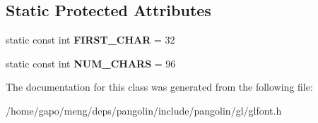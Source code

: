 \subsection*{Static Protected Attributes}
\begin{DoxyCompactItemize}
\item 
static const int {\bfseries F\+I\+R\+S\+T\+\_\+\+C\+H\+AR} = 32\hypertarget{classpangolin_1_1_gl_font_ab37c43cd34933cdf0b8dc675a69183e5}{}\label{classpangolin_1_1_gl_font_ab37c43cd34933cdf0b8dc675a69183e5}

\item 
static const int {\bfseries N\+U\+M\+\_\+\+C\+H\+A\+RS} = 96\hypertarget{classpangolin_1_1_gl_font_a4b4292de8a07f1a431dc0e7130b39c00}{}\label{classpangolin_1_1_gl_font_a4b4292de8a07f1a431dc0e7130b39c00}

\end{DoxyCompactItemize}


The documentation for this class was generated from the following file\+:\begin{DoxyCompactItemize}
\item 
/home/gapo/meng/deps/pangolin/include/pangolin/gl/glfont.\+h\end{DoxyCompactItemize}
